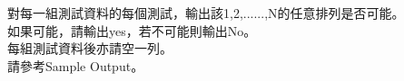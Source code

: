 對每一組測試資料的每個測試，輸出該1,2,......,N的任意排列是否可能。\\
如果可能，請輸出yes，若不可能則輸出No。\\
每組測試資料後亦請空一列。\\
請參考Sample Output。\\
